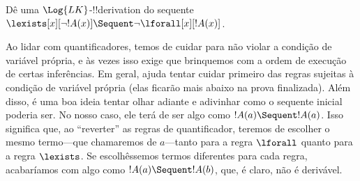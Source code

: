 \documentclass[../../../include/open-logic-section]{subfiles}
\begin{document}


\begin{ex}
Dê uma $\Log{LK}$-!!{derivation} do sequente $\lexists[x][\lnot !A(x)]
\Sequent \lnot \lforall[x][!A(x)]$.

Ao lidar com quantificadores, temos de cuidar para não violar a
condição de variável própria, e às vezes isso exige que brinquemos com
a ordem de execução de certas inferências. Em geral, ajuda tentar
cuidar primeiro das regras sujeitas à condição de variável própria
(elas ficarão mais abaixo na prova finalizada). Além disso, é uma boa
ideia tentar olhar adiante e adivinhar como o sequente inicial poderia
ser. No nosso caso, ele terá de ser algo como $!A(a) \Sequent !A(a)$.
Isso significa que, ao ``reverter'' as regras de quantificador,
teremos de escolher o mesmo termo---que chamaremos de $a$---tanto para
a regra $\lforall$ quanto para a regra $\lexists$. Se escolhêssemos
termos diferentes para cada regra, acabaríamos com algo como $!A(a)
\Sequent !A(b)$, que, é claro, não é derivável.


\end{ex}
\end{document}

